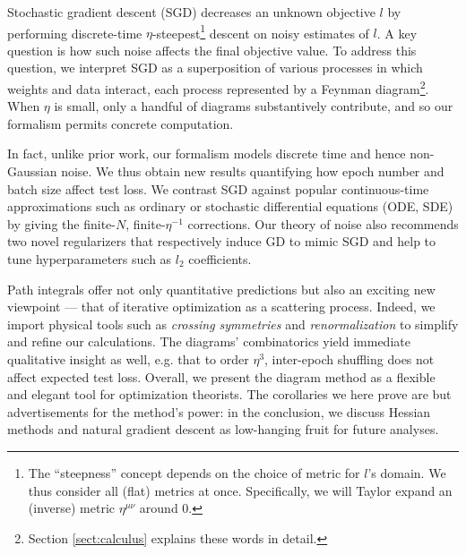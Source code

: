 \documentclass{article}
\theoremstyle{plain}
\theoremstyle{definition}
\begin{document}

        Stochastic gradient descent (SGD) decreases an unknown objective $l$ by
        performing discrete-time $\eta$-steepest\footnote{
            The ``steepness'' concept depends on the choice of metric for
            $l$'s domain.  We thus consider all (flat) metrics at once.
            Specifically, we will Taylor expand an (inverse) metric
            $\eta^{\mu\nu}$ around $0$.
        } descent on noisy estimates of $l$.
        A key question is how such noise affects the final objective value.  To
        address this question, we interpret SGD as a superposition of various
        processes in which weights and data interact, each process represented
        by a Feynman diagram\footnote{
            Section \ref{sect:calculus} explains these words in detail.
        }.  When $\eta$ is small, only a handful of diagrams
        substantively contribute, and so our formalism permits concrete
        computation.


        In fact, unlike prior work, our formalism models discrete time and
        hence non-Gaussian noise.  We thus obtain new results quantifying how
        epoch number and batch size affect test loss.  We contrast SGD against
        popular continuous-time approximations such as ordinary or stochastic
        differential equations (ODE, SDE) by giving the finite-$N$,
        finite-$\eta^{-1}$ corrections.  Our theory of noise also recommends
        two novel regularizers that respectively induce GD to mimic SGD and
        help to tune hyperparameters such as $l_2$ coefficients. 


        Path integrals offer not only quantitative predictions but also an
        exciting new viewpoint --- that of iterative optimization as a
        scattering process.  Indeed, we import physical tools such as
        \emph{crossing symmetries} \citep{dy49b} and \emph{renormalization}
        \citep{ge54} to simplify and refine our calculations.  The diagrams'
        combinatorics yield immediate qualitative insight as well, e.g. that to
        order $\eta^3$, inter-epoch shuffling does not affect expected test
        loss.  Overall, we present the diagram method as a flexible and elegant
        tool for optimization theorists.  The corollaries we here prove are
        but advertisements for the method's power: in the conclusion, we
        discuss Hessian methods and natural gradient descent as low-hanging
        fruit for future analyses.
\end{document}
